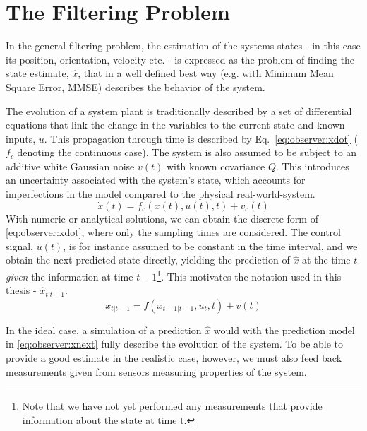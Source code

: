 \section{The Filtering Problem}
\label{sec:observer:filtering}
    In the general filtering problem, the estimation of the systems states - in this case
    its position, orientation, velocity etc. - is
    expressed as the problem of finding the state estimate,
    $\hat{x}$, that in a well defined best way (e.g. with Minimum Mean Square Error, MMSE)
    describes the behavior of the system.

    The evolution of a system plant is traditionally described by a set of differential equations
    that link the change in the variables to the current state and known inputs, $u$.
    This propagation through time is described by Eq.~\eqref{eq:observer:xdot} ($f_{c}$ denoting the continuous case).
    The system is also assumed to be subject to an additive white Gaussian noise $v(t)$ with
    known covariance $Q$.
    This introduces an uncertainty associated with the system's state, which accounts
    for imperfections in the model compared to the physical real-world-system.
    \begin{equation}
        \label{eq:observer:xdot}
        \dot{x}(t) = f_{c}(x(t),u(t),t) + v_{c}(t)
    \end{equation}
    With numeric or analytical solutions, we can obtain the discrete form of
    \eqref{eq:observer:xdot}, where only the sampling times are considered.
    The control signal, $u(t)$, is for instance assumed to be constant in the time interval,
    and we obtain the next predicted state directly, yielding the prediction of $\hat{x}$
    at the time $t$ \textit{given} the information at time
    $t-1$\footnote{Note that we have not yet performed any measurements that provide information about the state at time t.}.
    This motivates the notation used in this thesis - $\hat{x}_{t|t-1}$.
    \begin{equation}
        \label{eq:observer:xnext}
        x_{t|t-1} = f(x_{t-1|t-1},u_{t},t) + v(t)
    \end{equation}

    In the ideal case, a simulation of a prediction $\hat{x}$ would
    with the prediction model in \eqref{eq:observer:xnext} fully describe
    the evolution of the system.
    To be able to provide a good estimate in the realistic case, however,
    we must also feed back measurements given from sensors measuring
    properties of the system.

